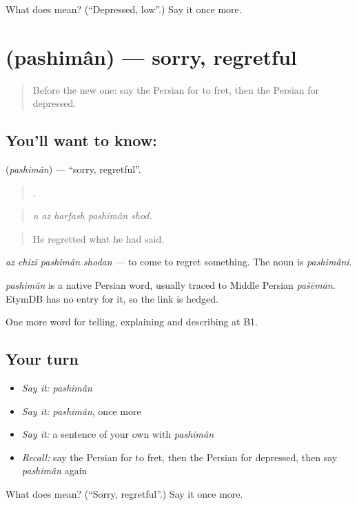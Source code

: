 \begin{tcolorbox}[breakable,colback=teal!4,colframe=teal!35!black,title={Before you move on}]
What does  mean? (\textquotedblleft{}Depressed, low\textquotedblright{}.) Say it once more.
\end{tcolorbox}
\section[\texorpdfstring{\fa{پشیمان} (pashimân)}{پشیمان (pashimân)}]{ (pashimân) — sorry, regretful}

\label{lesson:FA-C484-pashiman}



\begin{quote}
Before the new one: say the Persian for to fret, then the Persian for depressed.
\end{quote}

\subsection*{You'll want to know: }
\textbf{} (\emph{pashimân}) — \textquotedblleft{}sorry, regretful\textquotedblright{}.

\begin{quote}
    .
\end{quote}

\begin{quote}
\emph{u az harfash pashimân shod.}
\end{quote}

\begin{quote}
He regretted what he had said.
\end{quote}

\emph{az chizi pashimân shodan} — to come to regret something. The noun is \emph{pashimâni}.

\begin{cousinweb}
\emph{pashimân} is a native Persian word, usually traced to Middle Persian \emph{pašēmān}. EtymDB has no entry for it, so the link is hedged.
\end{cousinweb}

\begin{grammarlens}[title={What you've built}]
One more word for telling, explaining and describing at B1.
\end{grammarlens}

\subsection*{Your turn}
\begin{itemize}
\raggedright
  \item \emph{Say it:} \emph{pashimân}
  \item \emph{Say it:} \emph{pashimân}, once more
  \item \emph{Say it:} a sentence of your own with \emph{pashimân}
  \item \emph{Recall:} say the Persian for to fret, then the Persian for depressed, then say \emph{pashimân} again
\end{itemize}

\begin{tcolorbox}[breakable,colback=teal!4,colframe=teal!35!black,title={Before you move on}]
What does  mean? (\textquotedblleft{}Sorry, regretful\textquotedblright{}.) Say it once more.
\end{tcolorbox}
